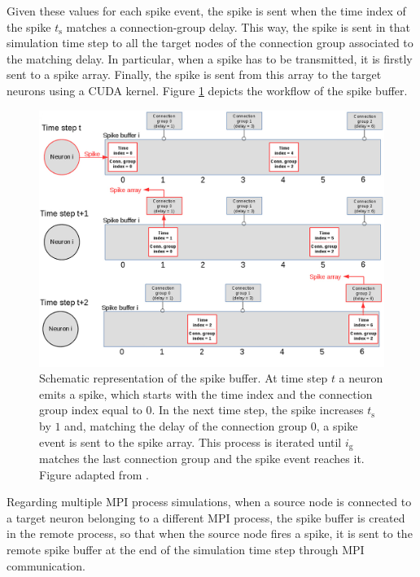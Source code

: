 \documentclass[a4paper, 12pt, twoside, openright]{book}
\begin{document}
Given these values for each spike event, the spike is sent when the time index of the spike $t_{\text{s}}$ matches a connection-group delay. This way, the spike is sent in that simulation time step to all the target nodes of the connection group associated to the matching delay. In particular, when a spike has to be transmitted, it is firstly sent to a spike array. Finally, the spike is sent from this array to the target neurons using a CUDA kernel. Figure \ref{fig:spike_delivery_algorithm} depicts the workflow of the spike buffer.

\begin{figure}[H]
    \centering
    \includegraphics[width=\columnwidth]{figures/spike_buffer_array.jpg}
    \caption{Schematic representation of the spike buffer. At time step $t$ a neuron emits a spike, which starts with the time index and the connection group index equal to $0$. In the next time step, the spike increases $t_{\text{s}}$ by $1$ and, matching the delay of the connection group $0$, a spike event is sent to the spike array. This process is iterated until $i_{\text{g}}$ matches the last connection group and the spike event reaches it. Figure adapted from \cite{Golosio2021}.}
    \label{fig:spike_delivery_algorithm}
\end{figure}

Regarding multiple MPI process simulations, when a source node is connected to a target neuron belonging to a different MPI process, the spike buffer is created in the remote process, so that when the source node fires a spike, it is sent to the remote spike buffer at the end of the simulation time step through MPI communication.
\end{document}
